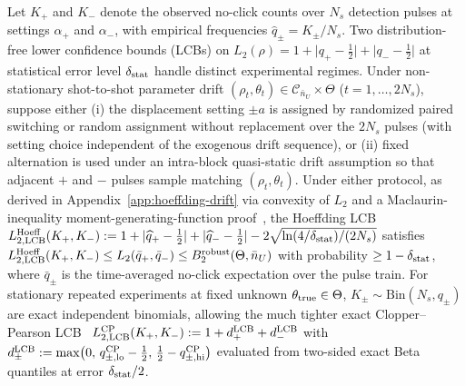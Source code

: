 \documentclass{iopjournal}
\newcommand{\Cset}{\mathcal{C}}
\newcommand{\nU}{\bar n_U}
\newcommand{\abs}[1]{\lvert #1\rvert}
\begin{document}
Let $K_+$ and $K_-$ denote the observed no-click counts over $N_s$ detection pulses at settings $\alpha_+$ and $\alpha_-$, with empirical frequencies $\widehat q_\pm = K_\pm/N_s$. Two distribution-free lower confidence bounds (LCBs) on $L_2(\rho) = 1 + \abs{q_+ - \frac{1}{2}} + \abs{q_- - \frac{1}{2}}$ at statistical error level $\delta_{\rm stat}$ handle distinct experimental regimes. Under non-stationary shot-to-shot parameter drift $(\rho_t, \theta_t) \in \Cset_{\nU} \times \Theta$ ($t = 1,\dots,2N_s$), suppose either (i) the displacement setting $\pm a$ is assigned by randomized paired switching or random assignment without replacement over the $2N_s$ pulses (with setting choice independent of the exogenous drift sequence), or (ii) fixed alternation is used under an intra-block quasi-static drift assumption so that adjacent $+$ and $-$ pulses sample matching $(\rho_t,\theta_t)$. Under either protocol, as derived in Appendix~\ref{app:hoeffding-drift} via convexity of $L_2$ and a Maclaurin-inequality moment-generating-function proof~\cite{Hoeffding1963}, the Hoeffding LCB $L_{2,\rm LCB}^{\rm Hoeff}(K_+,K_-) := 1 + \abs{\widehat q_+ - \frac{1}{2}} + \abs{\widehat q_- - \frac{1}{2}} - 2\sqrt{\ln(4/\delta_{\rm stat})/(2N_s)}$ satisfies $L_{2,\rm LCB}^{\rm Hoeff}(K_+,K_-) \le L_2(\bar q_+,\bar q_-) \le B_2^{\rm robust}(\Theta,\nU)$ with probability $\ge 1 - \delta_{\rm stat}$, where $\bar q_\pm$ is the time-averaged no-click expectation over the pulse train. For stationary repeated experiments at fixed unknown $\theta_{\rm true} \in \Theta$, $K_\pm \sim \mathrm{Bin}(N_s, q_\pm)$ are exact independent binomials, allowing the much tighter exact Clopper--Pearson LCB~\cite{ClopperPearson1934} $L_{2,\rm LCB}^{\rm CP}(K_+,K_-) := 1 + d_+^{\rm LCB} + d_-^{\rm LCB}$ with $d_\pm^{\rm LCB} := \max\bigl(0,\, q_{\pm,\rm lo}^{\rm CP} - \frac{1}{2},\, \frac{1}{2} - q_{\pm,\rm hi}^{\rm CP}\bigr)$ evaluated from two-sided exact Beta quantiles at error $\delta_{\rm stat}/2$.
\end{document}
